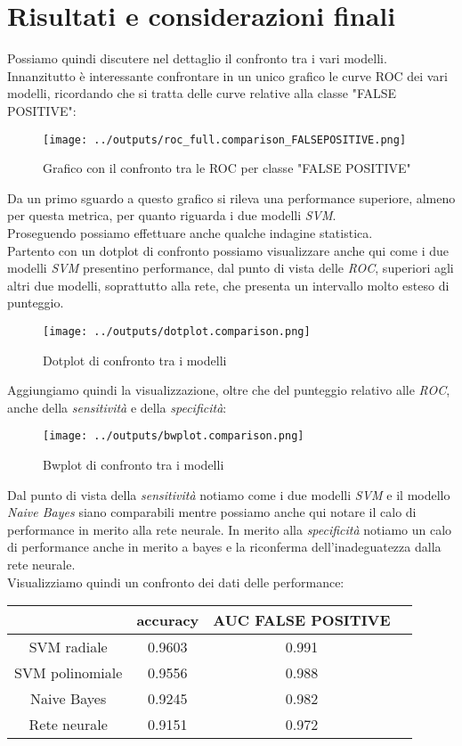 \chapter{Risultati e considerazioni finali}
Possiamo quindi discutere nel dettaglio il confronto tra i vari modelli.\\
Innanzitutto è interessante confrontare in un unico grafico le curve ROC dei 
vari modelli, ricordando che si tratta delle curve relative alla classe 
"FALSE POSITIVE":
\begin{figure}[H]
    \centering
    \texttt{[image: ../outputs/roc\_full.comparison\_FALSEPOSITIVE.png]}
    \caption{Grafico con il confronto tra le ROC per classe "FALSE POSITIVE"}
\end{figure}
Da un primo sguardo a questo grafico si rileva una performance superiore, almeno
per questa metrica, per quanto riguarda i due modelli \textit{SVM}.\\
Proseguendo possiamo effettuare anche qualche indagine statistica.\\
Partento con un dotplot di confronto possiamo visualizzare anche qui come i due 
modelli \textit{SVM} presentino performance, dal punto di vista delle 
\textit{ROC}, superiori agli altri due modelli, soprattutto alla rete, che 
presenta un intervallo molto esteso di punteggio.
\begin{figure}[H]
    \centering
    \texttt{[image: ../outputs/dotplot.comparison.png]}
    \caption{Dotplot di confronto tra i modelli}
\end{figure}
Aggiungiamo quindi la visualizzazione, oltre che del punteggio relativo alle 
\textit{ROC}, anche della \textit{sensitività} e della \textit{specificità}:
\begin{figure}[H]
    \centering
    \texttt{[image: ../outputs/bwplot.comparison.png]}
    \caption{Bwplot di confronto tra i modelli}
\end{figure}
Dal punto di vista della \textit{sensitività} notiamo come i due modelli 
\textit{SVM} e il modello \textit{Naive Bayes} siano comparabili mentre possiamo 
anche qui notare il calo di performance in merito alla rete neurale. In merito 
alla \textit{specificità} notiamo un calo di performance anche in merito a bayes 
e la riconferma dell'inadeguatezza dalla rete neurale.\\
Visualizziamo quindi un confronto dei dati delle performance:
\begin{table}[H]
    \centering
    \begin{tabular}{c||c|c|c}
        & accuracy  & AUC FALSE POSITIVE \\
        \hline
        \hline
        SVM radiale & 0.9603  & 0.991\\
        SVM polinomiale & 0.9556 & 0.988\\
        Naive Bayes & 0.9245 & 0.982\\
        Rete neurale & 0.9151 & 0.972  
    \end{tabular}
\end{table}
